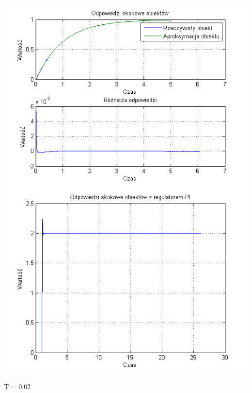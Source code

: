 \documentclass[10pt,a4paper]{article}
\begin{document}
\begin{center}
\includegraphics[scale=1]{images/jeden/skrypt_87.png}\\
\includegraphics[scale=1]{images/jeden/skrypt_88.png}\\
\end{center}
\newpage
T = 0.02
\end{document}
